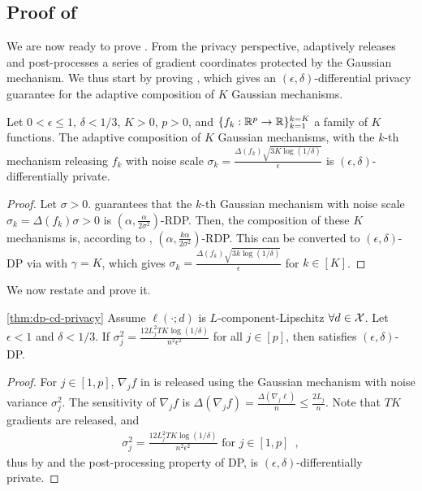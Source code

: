 \subsection{Proof of }

We are now ready to prove .
From the privacy perspective,  adaptively releases
and post-processes a series of gradient coordinates protected by the Gaussian
mechanism. We thus start by proving
, which gives an $
(\epsilon,\delta)$-differential privacy
guarantee for the adaptive composition of $K$ Gaussian mechanisms.

\begin{lemma}
  \label{lemma:rdp-composition-gaussian-k}
  Let $0 < \epsilon \le 1$, $\delta < 1/3$, $K > 0$, $p > 0$, and
  $\{f_k : \mathbb R^p \rightarrow \mathbb R\}_{k=1}^{k=K}$ a family of $K$ functions.
  The adaptive composition of $K$ Gaussian mechanisms,
  with the $k$-th mechanism releasing
  $f_k$ with noise scale $\sigma_k = \frac{\Delta(f_k) \sqrt{3K \log(1/\delta)}}{\epsilon}$
  is $(\epsilon, \delta)$-differentially private.
\end{lemma}
\begin{proof}
  Let $\sigma > 0$.  guarantees that
  the $k$-th Gaussian mechanism with noise scale
  $\sigma_k = \Delta(f_k) \sigma > 0$ is
  $(\alpha, \frac{\alpha}{2 \sigma^2})$-RDP.  Then, the composition of
  these $K$ mechanisms is, according to ,
  $(\alpha, \frac{k\alpha}{2 \sigma^2})$-RDP.  This can be converted
  to $(\epsilon,\delta)$-DP via  with
  $\gamma = K$, which gives
  $\sigma_k = \frac{\Delta(f_k)\sqrt{3 k \log(1/\delta)}}{\epsilon}$
  for $k\in[K]$.
  \end{proof}

We now restate  and prove it.

\begin{restate-theorem}{\ref{thm:dp-cd-privacy}}
  Assume $\ell(\cdot;d)$ is $L$-component-Lipschitz $\forall d\in\mathcal X$.
  Let $\epsilon < 1$ and $\delta < 1/3$.
  If $\sigma_j^2 = \frac{12L_j^2 TK \log(1/\delta)}{n^2\epsilon^2}$
  for all $j \in [p]$,
  then  satisfies $(\epsilon, \delta)$-DP.
\end{restate-theorem}

\begin{proof}
  For $j \in [1, p]$, $\nabla_j f$ in  is released using the
  Gaussian mechanism with noise variance $\sigma_j^2$.
  The sensitivity of $\nabla_j f$
  is $\Delta(\nabla_j f) = \frac{\Delta (\nabla_j \ell)}{n} \le \frac{2L_j}
  {n}$. Note that $TK$ gradients are released, and
  \begin{align*}
    \sigma_j^2 = \frac{12L_j^2 TK \log(1/\delta)}{n^2\epsilon^2} \text{ for } j \in [1, p]\enspace,
  \end{align*}
  thus by  and the post-processing
  property of DP,
  is  $(\epsilon, \delta)$-differentially private.
\end{proof}


